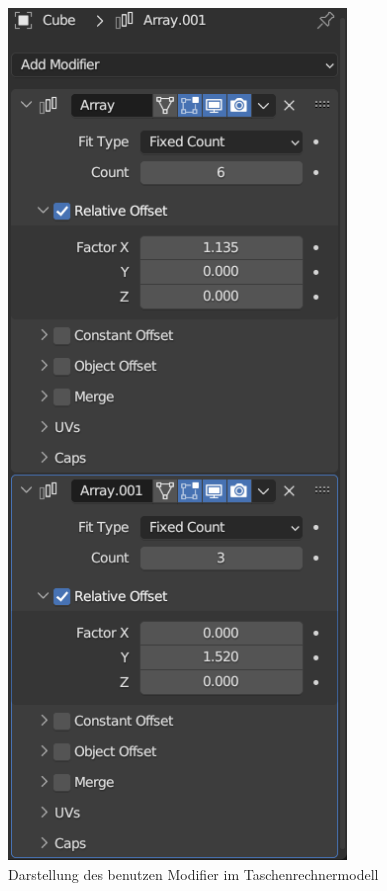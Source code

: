 \begin{figure}[h]
\centering
\includegraphics[width=0.8\textwidth]{images/blendermodifier.png}
\caption{Darstellung des benutzen Modifier im Taschenrechnermodell}
\label{fig:blendermodifier}
\end{figure}

